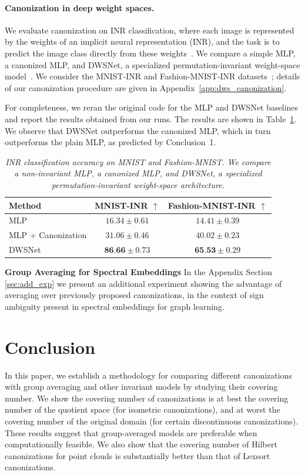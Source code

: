 \paragraph{Canonization in deep weight spaces.}
We evaluate canonization on INR classification, where each image is represented by the weights of an implicit neural representation (INR), and the task is to predict the image class directly from these weights~\citep{pmlr-v202-navon23a}. We compare a simple MLP, a canonized MLP, and DWSNet, a specialized permutation-invariant weight-space model~\citep{pmlr-v202-navon23a}. We consider the MNIST-INR and Fashion-MNIST-INR datasets~\citep{pmlr-v202-navon23a}; details of our canonization procedure are given in Appendix~\ref{app:dws_canonization}.

For completeness, we reran the original code for the MLP and DWSNet baselines and report the results obtained from our runs. The results are shown in Table~\ref{tab:dws_canonization}. We observe that DWSNet outperforms the canonized MLP, which in turn outperforms the plain MLP, as predicted by Conclusion~1.

\begin{table}[h]
\centering
\caption{\it INR classification accuracy on MNIST and Fashion-MNIST.
We compare a non-invariant MLP,  a canonized MLP, and DWSNet, a specialized
permutation-invariant weight-space architecture.}
\label{tab:dws_canonization}
\begin{tabular}{lcc}
\toprule
\textbf{Method}
& \textbf{MNIST-INR} $\uparrow$
& \textbf{Fashion-MNIST-INR} $\uparrow$ \\
\midrule
MLP
& $16.34 \pm 0.61$
& $14.41 \pm 0.39$ \\


MLP + Canonization
& $31.06 \pm 0.46$

& $40.02 \pm 0.23$
 \\
DWSNet
& $\textbf{86.66} \pm 0.73$
& $\textbf{65.53} \pm 0.29$ \\
\bottomrule
\end{tabular}
\end{table}

\textbf{Group Averaging for Spectral Embeddings} In the Appendix
 Section \ref{sec:add_exp} we present an additional experiment showing the advantage of averaging over previously proposed canonizations, in the context of sign ambiguity present in spectral embeddings for graph learning.


\section{Conclusion}
In this paper, we establish a methodology for comparing different canonizations with group averaging
and other invariant models by studying their covering number. We show the covering number of
canonizations is at best the covering number of the quotient space (for isometric canonizations), and
at worst the covering number of the original domain (for certain discontinuous canonizations). These
results suggest that group-averaged models are preferable when computationally feasible. We also
show that the covering number of Hilbert canonizations for point clouds is substantially better than
that of Lexsort canonizations.
